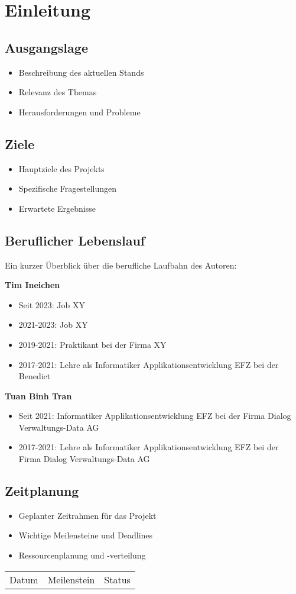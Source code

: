 \section{Einleitung}



\subsection{Ausgangslage}
\begin{itemize}
    \item Beschreibung des aktuellen Stands
    \item Relevanz des Themas
    \item Herausforderungen und Probleme
\end{itemize}

\subsection{Ziele}
\begin{itemize}
    \item Hauptziele des Projekts
    \item Spezifische Fragestellungen
    \item Erwartete Ergebnisse
\end{itemize}

\subsection{Beruflicher Lebenslauf}

Ein kurzer Überblick über die berufliche Laufbahn des Autoren:


\textbf{Tim Ineichen}
\begin{itemize}
    \item Seit 2023: Job XY
    \item 2021-2023: Job XY
    \item 2019-2021: Praktikant bei der Firma XY
    \item 2017-2021: Lehre als Informatiker Applikationsentwicklung EFZ bei der Benedict
\end{itemize}

\textbf{Tuan Binh Tran}
\begin{itemize}
    \item Seit 2021: Informatiker Applikationsentwicklung EFZ bei der Firma Dialog Verwaltungs-Data AG
    \item 2017-2021: Lehre als Informatiker Applikationsentwicklung EFZ bei der Firma Dialog Verwaltungs-Data AG
\end{itemize}

\subsection{Zeitplanung}
\begin{itemize}
    \item Geplanter Zeitrahmen für das Projekt
    \item Wichtige Meilensteine und Deadlines
    \item Ressourcenplanung und -verteilung
\end{itemize}

\begin{tabular}{c c c}
    Datum & Meilenstein & Status \\
    
\end{tabular}


\newpage